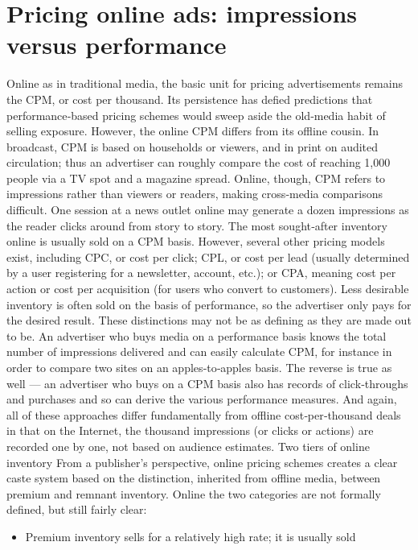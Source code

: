 \section{Pricing online ads: impressions versus performance}
Online as in traditional media, the basic unit for pricing advertisements
remains the CPM, or cost per thousand. Its persistence has defied
predictions that performance‐based pricing schemes would sweep aside
the old‐media habit of selling exposure.
However, the online CPM differs from its offline cousin. In broadcast,
CPM is based on households or viewers, and in print on audited
circulation; thus an advertiser can roughly compare the cost of reaching
1,000 people via a TV spot and a magazine spread. Online, though, CPM
refers to impressions rather than viewers or readers, making cross‐media
comparisons difficult. One session at a news outlet online may generate a
dozen impressions as the reader clicks around from story to story.
The most sought‐after inventory online is usually sold on a CPM basis.
However, several other pricing models exist, including CPC, or cost
per click; CPL, or cost per lead (usually determined by a user registering
for a newsletter, account, etc.); or CPA, meaning cost per action or cost
per acquisition (for users who convert to customers). Less desirable
inventory is often sold on the basis of performance, so the advertiser only
pays for the desired result.
These distinctions may not be as defining as they are made out to be. An
advertiser who buys media on a performance basis knows the total
number of impressions delivered and can easily calculate CPM, for
instance in order to compare two sites on an apples‐to‐apples basis. The
reverse is true as well — an advertiser who buys on a CPM basis also has
records of click‐throughs and purchases and so can derive the various
performance measures. And again, all of these approaches differ
fundamentally from offline cost‐per‐thousand deals in that on the
Internet, the thousand impressions (or clicks or actions) are recorded one
by one, not based on audience estimates.
Two tiers of online inventory
From a publisher’s perspective, online pricing schemes creates a clear
caste system based on the distinction, inherited from offline media,
between premium and remnant inventory. Online the two categories are
not formally defined, but still fairly clear:
\begin{itemize}
\item Premium inventory sells for a relatively high rate; it is usually sold
\end{itemize}
